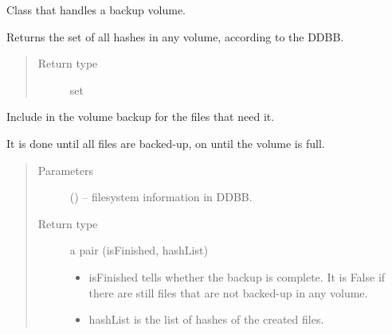 \documentclass[letterpaper,10pt,english]{sphinxmanual}
\begin{document}
\begin{fulllineitems}
\label{\detokenize{index:fsbackup.hashVolume.HashVolume}}
Class that handles a backup volume.

\begin{fulllineitems}
\label{\detokenize{index:fsbackup.hashVolume.HashVolume.allVolumesHashes}}
Returns the set of all hashes in any volume, according to the DDBB.
\begin{quote}\begin{description}
\item[{Return type}] \leavevmode
set

\end{description}\end{quote}

\end{fulllineitems}


\begin{fulllineitems}
\label{\detokenize{index:fsbackup.hashVolume.HashVolume.augmentWithFiles}}
Include in the volume backup for the files that need it.

It is done until all files are backed-up, on until the volume is full.
\begin{quote}\begin{description}
\item[{Parameters}] \leavevmode
{} ({\hyperref[\detokenize{index:fsbackup.fileDB.FileDB}]{}}) -- filesystem information in DDBB.

\item[{Return type}] \leavevmode

a pair (isFinished, hashList)
\begin{itemize}
\item {} 
isFinished tells whether the backup is complete. It is False if there are still
files that are not backed-up in any volume.

\item {} 
hashList is the list of hashes of the created files.


\end{itemize}
\end{description}
\end{quote}
\end{fulllineitems}
\end{fulllineitems}
\end{document}
